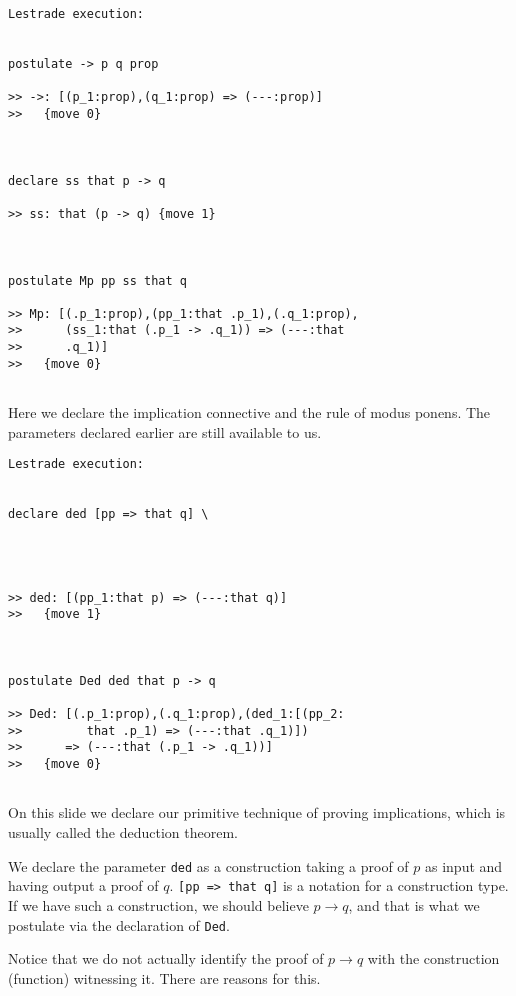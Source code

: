 \documentclass{slides}
\begin{document}
\begin{slide}

\begin{verbatim}Lestrade execution:


postulate -> p q prop

>> ->: [(p_1:prop),(q_1:prop) => (---:prop)]
>>   {move 0}



declare ss that p -> q

>> ss: that (p -> q) {move 1}



postulate Mp pp ss that q

>> Mp: [(.p_1:prop),(pp_1:that .p_1),(.q_1:prop),
>>      (ss_1:that (.p_1 -> .q_1)) => (---:that
>>      .q_1)]
>>   {move 0}


\end{verbatim}

\end{slide}

\begin{slide}

Here we declare the implication connective and the rule of modus ponens.  The parameters declared earlier are still available to us.

\end{slide}

\begin{slide}

\begin{verbatim}Lestrade execution:


declare ded [pp => that q] \
   



>> ded: [(pp_1:that p) => (---:that q)]
>>   {move 1}



postulate Ded ded that p -> q

>> Ded: [(.p_1:prop),(.q_1:prop),(ded_1:[(pp_2:
>>         that .p_1) => (---:that .q_1)])
>>      => (---:that (.p_1 -> .q_1))]
>>   {move 0}


\end{verbatim}
\end{slide}

\begin{slide}

On this slide we declare our primitive technique of proving implications, which is usually called the deduction theorem.

We declare the parameter {\tt ded} as a construction taking a proof of $p$ as input and having output a proof of $q$.  {\tt [pp => that q]} is a notation for a construction type.  If we have such a construction,
we should believe $p \rightarrow q$, and that is what we postulate via the declaration of {\tt Ded}.

Notice that we do not actually identify the proof of $p \rightarrow q$ with the construction (function) witnessing it.  There are reasons for this.

\end{slide}
\end{document}
